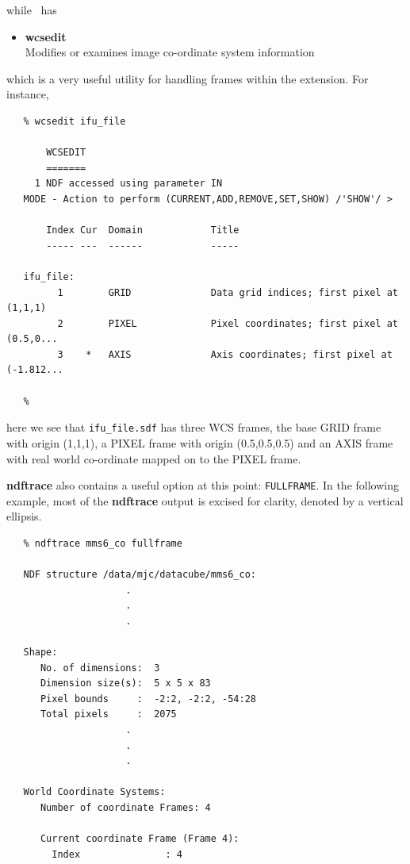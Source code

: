 \documentclass[twoside,11pt]{article}
\newcommand{\xref}[3]{#1}
\begin{document}
{while \CCDPACK\ has

\begin{itemize}  
\item{\xref{{\bf wcsedit}}{sun139}{WCSEDIT}}\\
Modifies or examines image co-ordinate system information
\end{itemize}

which is a very useful utility for handling frames within the extension.
For instance,

\small\begin{verbatim}
   % wcsedit ifu_file

       WCSEDIT
       =======
     1 NDF accessed using parameter IN
   MODE - Action to perform (CURRENT,ADD,REMOVE,SET,SHOW) /'SHOW'/ > 

       Index Cur  Domain            Title
       ----- ---  ------            -----

   ifu_file:
         1        GRID              Data grid indices; first pixel at (1,1,1)
         2        PIXEL             Pixel coordinates; first pixel at (0.5,0...
         3    *   AXIS              Axis coordinates; first pixel at (-1.812...

   %
\end{verbatim}\normalsize

here we see that {\tt ifu\_file.sdf} has three WCS frames, the base
GRID frame with origin (1,1,1), a PIXEL frame with origin
(0.5,0.5,0.5) and an AXIS frame with real world co-ordinate mapped
on to the PIXEL frame.  

\xref{{\bf ndftrace}}{sun95}{NDFTRACE} also contains a useful option at this
point: {\tt FULLFRAME}.  In the following example, most of the {\bf ndftrace}
output is excised for clarity, denoted by a vertical ellipsis.

\small\begin{verbatim}
   % ndftrace mms6_co fullframe

   NDF structure /data/mjc/datacube/mms6_co:
                     .
                     .
                     .

   Shape:
      No. of dimensions:  3
      Dimension size(s):  5 x 5 x 83
      Pixel bounds     :  -2:2, -2:2, -54:28
      Total pixels     :  2075
                     .
                     .
                     .

   World Coordinate Systems:
      Number of coordinate Frames: 4

      Current coordinate Frame (Frame 4):
        Index               : 4


\end{verbatim}}
\end{document}
